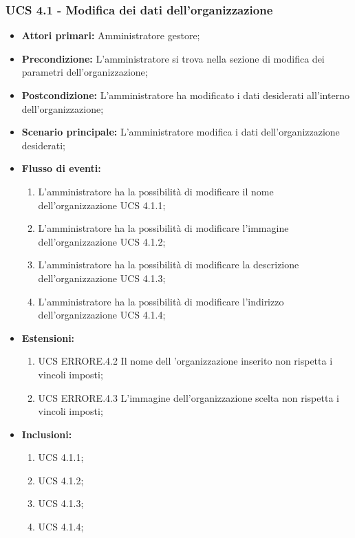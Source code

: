 \subsubsection{UCS 4.1 - Modifica dei dati dell'organizzazione}%
\begin{itemize}
    \item \textbf{Attori primari:} Amministratore gestore;
    \item \textbf{Precondizione:} L'amministratore si trova nella sezione di modifica dei parametri dell'organizzazione;
    \item \textbf{Postcondizione:} L'amministratore ha modificato i dati desiderati all'interno dell’organizzazione;
    \item \textbf{Scenario principale:} L'amministratore modifica i dati dell'organizzazione desiderati;
    \item \textbf{Flusso di eventi:}
    \begin{enumerate}
        \item L'amministratore ha la possibilità di modificare il nome dell'organizzazione UCS 4.1.1;
        \item L'amministratore ha la possibilità di modificare l'immagine dell'organizzazione UCS 4.1.2;
        \item L'amministratore ha la possibilità di modificare la descrizione dell'organizzazione UCS 4.1.3;
        \item L'amministratore ha la possibilità di modificare l'indirizzo dell'organizzazione UCS 4.1.4;
    \end{enumerate}
    \item \textbf{Estensioni:}
    \begin{enumerate}
        \item UCS ERRORE.4.2 Il nome dell 'organizzazione inserito non rispetta i vincoli imposti;
        \item UCS ERRORE.4.3 L'immagine dell'organizzazione scelta non rispetta i vincoli imposti;
    \end{enumerate}
    \item \textbf{Inclusioni:}
    \begin{enumerate}
	    \item UCS 4.1.1;
	    \item UCS 4.1.2;
	    \item UCS 4.1.3;
	    \item UCS 4.1.4;
    \end{enumerate}
\end{itemize}

